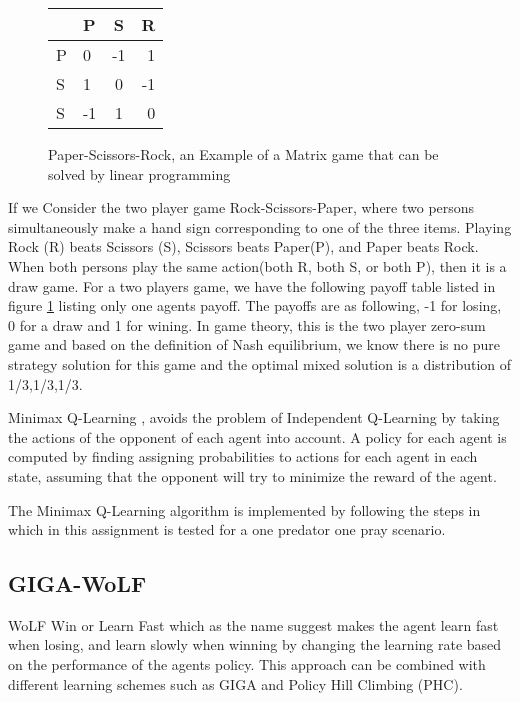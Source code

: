 \documentclass[a4paper,12pt]{article}
\begin{document}
\begin{figure}[ht!]
\centering
\def\arraystretch{1}%
    \begin{tabular}{|l |l | c | r|}
    \hline
    &P&S&R\\
\hline
P&0&-1&1\\
\hline
S&1&0&-1\\
\hline
S&-1&1&0\\
\hline
\end{tabular}
        \caption{Paper-Scissors-Rock, an Example of a Matrix game that can be solved by linear programming}
        \label{fig:psr}
\end{figure}
If we Consider the two player game Rock-Scissors-Paper, where two persons simultaneously make a hand sign corresponding to one of the three items. Playing Rock (R) beats Scissors (S), Scissors beats Paper(P), and Paper beats Rock. 
When both persons play the same action(both R, both S, or both P), then it is a draw game. For a two players game, we have the following payoff table listed in figure \ref{fig:psr} listing only one agents payoff. The payoffs are as following, -1 for losing, 0 for a draw and 1 for wining.
In game theory, this is the two player zero-sum game and based on the definition of Nash equilibrium, we know there is no pure strategy solution for this game and the optimal mixed solution is a distribution of 1/3,1/3,1/3. 

Minimax Q-Learning \cite{minimax}, avoids the problem of Independent Q-Learning by taking the actions of the opponent of each agent into account. A policy for each agent is computed by finding assigning probabilities to actions for each agent in each state, assuming that the opponent will try to minimize the reward of the agent. 

The Minimax Q-Learning algorithm is implemented by following the steps in \cite{hk} which in this assignment is tested for a one predator one pray scenario.

\subsection{GIGA-WoLF}
WoLF Win or Learn Fast \cite{GIGA-wolf} \cite{PHC} which as the name suggest makes the agent learn fast when losing, and learn slowly when winning by changing the learning rate based on the performance of the agents policy. This approach can be combined with different learning schemes such as GIGA\cite{GIGA-wolf} and Policy Hill Climbing (PHC)\cite{PHC}.
\\
\end{document}
